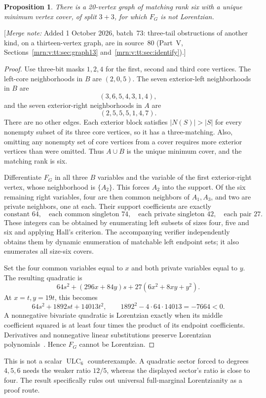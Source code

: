 \documentclass[11pt,a4paper]{article}
\newtheorem{proposition}[theorem]{Proposition}
\theoremstyle{remark}\newtheorem{remark}[theorem]{Remark}
\newcommand{\ULC}{\operatorname{ULC}}      %
\newcommand{\mnote}[1]{[\textit{Merge note:} #1]}
\begin{document}
\begin{proposition}\label{mrn:s:ne:prop:barrier}
There is a 20-vertex graph of matching rank six with a unique minimum vertex cover, of split $3+3$, for which $F_G$ is not Lorentzian.
\end{proposition}
\mnote{Added 1 October 2026, batch~73: three-tail obstructions of another kind,
on a thirteen-vertex graph, are in source~80 (Part~V,
Sections~\ref{mrn:v:tt:sec:graph13} and~\ref{mrn:v:tt:sec:identify}).}
\begin{proof}
Use three-bit masks $1,2,4$ for the first, second and third core vertices. The left-core neighborhoods in $B$ are $(2,0,5)$. The seven exterior-left neighborhoods in $B$ are
\[
 (3,6,5,4,3,1,4),
\]
and the seven exterior-right neighborhoods in $A$ are
\[
 (2,5,5,5,1,4,7).
\]
There are no other edges. Each exterior block satisfies $|N(S)|>|S|$ for every nonempty subset of its three core vertices, so it has a three-matching. Also, omitting any nonempty set of core vertices from a cover requires more exterior vertices than were omitted. Thus $A\cup B$ is the unique minimum cover, and the matching rank is six.

Differentiate $F_G$ in all three $B$ variables and the variable of the first exterior-right vertex, whose neighborhood is $\{A_2\}$. This forces $A_2$ into the support. Of the six remaining right variables, four are then common neighbors of $A_1,A_3$, and two are private neighbors, one at each. Their support coefficients are exactly
\[
 \text{constant }64,\quad
 \text{each common singleton }74,\quad
 \text{each private singleton }42,\quad
 \text{each pair }27.
\]
These integers can be obtained by enumerating left subsets of sizes four, five and six and applying Hall's criterion. The accompanying verifier independently obtains them by dynamic enumeration of matchable left endpoint sets; it also enumerates all size-six covers.

Set the four common variables equal to $x$ and both private variables equal to $y$. The resulting quadratic is
\begin{equation}\label{mrn:s:ne:eq:badquad}
 64s^2+(296x+84y)s+27(6x^2+8xy+y^2).
\end{equation}
At $x=t,y=19t$, this becomes
\[
 64s^2+1892st+14013t^2,
 \qquad 1892^2-4\cdot64\cdot14013=-7664<0.
\]
A nonnegative bivariate quadratic is Lorentzian exactly when its middle coefficient squared is at least four times the product of its endpoint coefficients. Derivatives and nonnegative linear substitutions preserve Lorentzian polynomials~\cite{b:BH}. Hence $F_G$ cannot be Lorentzian.
\end{proof}
This is not a scalar $\ULC_6$ counterexample. A quadratic sector forced to degrees $4,5,6$ needs the weaker ratio $12/5$, whereas the displayed sector's ratio is close to four. The result specifically rules out universal full-marginal Lorentzianity as a proof route.
\end{document}

